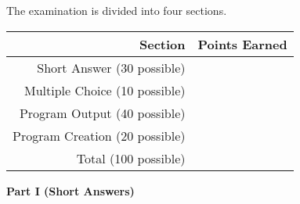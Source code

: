\documentclass[12pt]{article}
\begin{document}
\begin{center}
  The examination is divided into four sections. \\
  \vspace*{.3in}

  \begin{tabular}{|r | l|} \hline
    {\bf Section} & {\bf Points Earned} \\ \hline 
    {Short Answer (30 possible)} & \hspace*{1.5in} \\ 
    {Multiple Choice (10 possible)} & \hspace*{1.5in} \\    
    {Program Output  (40 possible)} & \hspace*{1.5in} \\    
    {Program Creation (20 possible)} & \hspace*{1.5in} \\ \hline
    {Total (100 possible)} & \hspace*{1.5in} \\ \hline
  \end{tabular}
\end{center}

\newpage

\noindent
{\bf Part I (Short Answers)}
\end{document}
